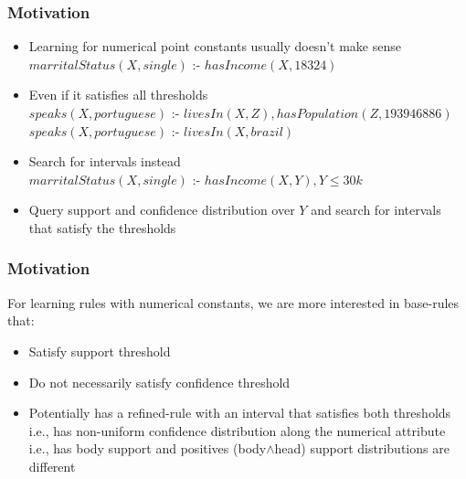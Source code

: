 \documentclass{beamer}
\begin{document}
\begin{frame}
\frametitle{Motivation}
\begin{itemize}
  \item Learning for numerical point constants usually doesn't make sense \\ \quad
      $marritalStatus(X,single)$ :- $hasIncome(X,18324)$ 
  \item Even if it satisfies all thresholds \\ 
      $speaks(X,portuguese)$ :- $livesIn(X,Z),hasPopulation(Z,193946886)$ \\
      $speaks(X,portuguese)$ :- $livesIn(X,brazil)$
  \item Search for intervals instead \\ \quad
      $marritalStatus(X,single)$ :- $hasIncome(X,Y),Y \leq 30k$
  \item Query support and confidence distribution over $Y$ and search for intervals that satisfy the thresholds \\ \quad
     
\end{itemize}


\end{frame}
\begin{frame}
\frametitle{Motivation}
 For learning rules with numerical constants, we are more interested in base-rules that:
 \begin{itemize}
  \item Satisfy support threshold
  \item Do not necessarily satisfy confidence threshold
  \item Potentially has a refined-rule with an interval that satisfies both thresholds \\
    \quad i.e., has non-uniform confidence distribution along the numerical attribute\\
    \quad i.e., has body support and positives (body$\wedge$head) support distributions are different
 \end{itemize}
\end{frame}
\end{document}
